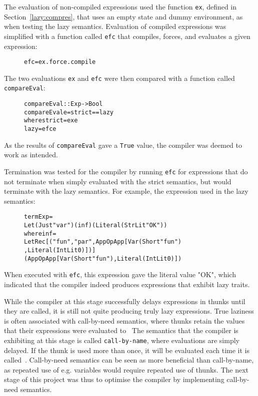 The evaluation of non-compiled expressions used the function \texttt{ex},
defined in Section~\ref{lazy:compres}, that uses an empty state and
dummy environment, as when testing the lazy semantics. Evaluation of
compiled expressions was simplified with a function called \texttt{efc} that
compiles, forces, and evaluates a given expression:

\begin{figure}[H]
\begin{alltt}
  efc = ex . force . compile
\end{alltt}
\end{figure}

\noindent The two evaluations \texttt{ex} and \texttt{efc} were then compared
with a function called \texttt{compareEval}:

\begin{figure}[H]
\begin{alltt}
  compareEval :: Exp -> Bool
  compareEval e = strict == lazy
    where strict = ex e
          lazy   = efc e
\end{alltt}
\end{figure}

\noindent As the results of \texttt{compareEval} gave a \texttt{True} value,
the compiler was deemed to work as intended.

Termination was tested for the compiler by running \texttt{efc} for expressions
that do not terminate when simply evaluated with the strict semantics, but would
terminate with the lazy semantics. For example, the expression used in the lazy
semantics:

\begin{figure}[H]
\begin{alltt}
  termExp =
    Let (Just "var") (inf) (Literal (StrLit "OK"))
    where inf =
      LetRec [("fun", "par", App OpApp [Var (Short "fun")
                                       ,Literal (IntLit 0)])]
      (App OpApp [Var (Short "fun"), Literal (IntLit 0)])
\end{alltt}
\end{figure}

\noindent When executed with \texttt{efc}, this expression gave the literal
value "OK", which indicated that the compiler indeed produces expressions that
exhibit lazy traits.

While the compiler at this stage successfully delays expressions in thunks
until they are called, it is still not quite producing truly lazy expressions.
True laziness is often associated with call-by-need semantics, where thunks
retain the values that their expressions were evaluated to~\cite{pltbook}
The semantics that
the compiler is exhibiting at this stage is called \texttt{call-by-name}, where
evaluations are simply delayed. If the thunk is used more than once, it will
be evaluated each time it is called~\cite{DragonBook}.
Call-by-need semantics can be seen as more beneficial than call-by-name, as
repeated use of e.g. variables would require repeated use of thunks.
The next stage of this project was thus to optimise the compiler by implementing
call-by-need semantics.
